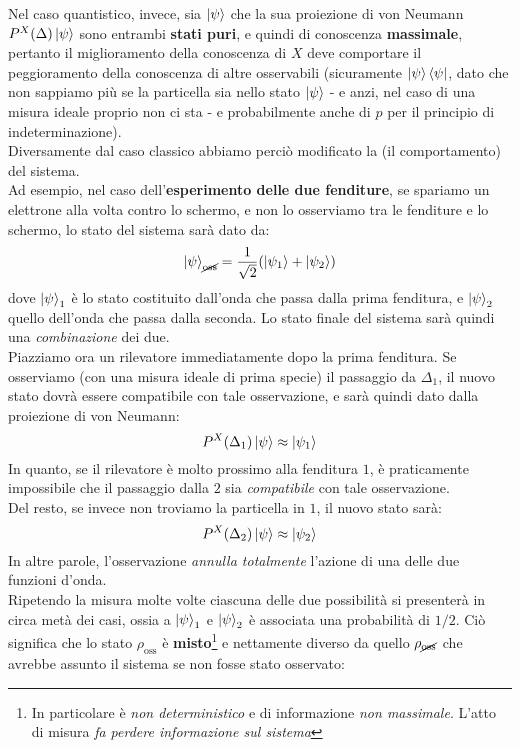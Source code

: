 \documentclass[../../FisicaTeorica.tex]{subfiles}
\begin{document}
Nel caso quantistico, invece, sia $\ket{\psi}$ che la sua proiezione di von Neumann $P^X(\Delta)\ket{\psi}$ sono entrambi \textbf{stati puri}, e quindi di conoscenza \textbf{massimale}, pertanto il miglioramento della conoscenza di $X$ deve comportare il peggioramento della conoscenza di altre osservabili (sicuramente $\ket{\psi}\bra{\psi}$, dato che non sappiamo più se la particella sia nello stato $\ket{\psi}$ - e anzi, nel caso di una misura ideale proprio non ci sta - e probabilmente anche di $p$ per il principio di indeterminazione).\\
Diversamente dal caso classico abbiamo perciò modificato la  (il comportamento) del sistema.\\
Ad esempio, nel caso dell'\textbf{esperimento delle due fenditure}, se spariamo un elettrone alla volta contro lo schermo, e non lo osserviamo tra le fenditure e lo schermo, lo stato del sistema sarà dato da:
\[
\ket{\psi}_{\cancel{\text{oss}}}=\frac{1}{\sqrt{2}}(\ket{\psi_1}+\ket{\psi_2})
\]
dove $\ket{\psi}_1$ è lo stato costituito dall'onda che passa dalla prima fenditura, e $\ket{\psi}_2$ quello dell'onda che passa dalla seconda. Lo stato finale del sistema sarà quindi una \textit{combinazione} dei due.\\
Piazziamo ora un rilevatore immediatamente dopo la prima fenditura. Se osserviamo (con una misura ideale di prima specie) il passaggio da $\Delta_1$, il nuovo stato dovrà essere compatibile con tale osservazione, e sarà quindi dato dalla proiezione di von Neumann:
\[
P^X(\Delta_1)\ket{\psi} \approx \ket{\psi_1}
\]
In quanto, se il rilevatore è molto prossimo alla fenditura $1$, è praticamente impossibile che il passaggio dalla $2$ sia \textit{compatibile} con tale osservazione.\\
Del resto, se invece non troviamo la particella in $1$, il nuovo stato sarà:
\[
P^X(\Delta_2)\ket{\psi} \approx \ket{\psi_2}
\]
In altre parole, l'osservazione \textit{annulla totalmente} l'azione di una delle due funzioni d'onda.\\
Ripetendo la misura molte volte ciascuna delle due possibilità si presenterà in circa metà dei casi, ossia a $\ket{\psi}_1$ e $\ket{\psi}_2$ è associata una probabilità di $1/2$. Ciò significa che lo stato $\rho_{\text{oss}}$ è \textbf{misto}\footnote{In particolare è \textit{non deterministico} e di informazione \textit{non massimale}. L'atto di misura \textit{fa perdere informazione sul sistema}} e nettamente diverso da quello $\rho_{\cancel{\text{oss}}}$ che avrebbe assunto il sistema se non fosse stato osservato:
\end{document}
